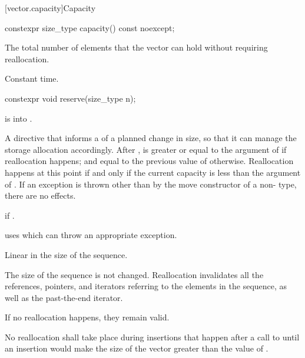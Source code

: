 [vector.capacity]{Capacity}

%
\begin{itemdecl}
constexpr size_type capacity() const noexcept;
\end{itemdecl}

\begin{itemdescr}
\pnum
\returns
The total number of elements that the vector can hold
without requiring reallocation.

\pnum
\complexity
Constant time.
\end{itemdescr}

%
\begin{itemdecl}
constexpr void reserve(size_type n);
\end{itemdecl}

\begin{itemdescr}
\pnum
\expects
{} is  into .

\pnum
\effects
A directive that informs a
of a planned change in size, so that it can manage the storage allocation accordingly.
After
,
is greater or equal to the argument of
if reallocation happens; and equal to the previous value of
otherwise.
Reallocation happens at this point if and only if the current capacity is less than the
argument of
. If an exception is thrown
other than by the move constructor of a non- type,
there are no effects.

\pnum
\throws
{} if .
\begin{footnote}
 uses  which
can throw an appropriate exception.
\end{footnote}

\pnum
\complexity
Linear in the size of the sequence.

\pnum
\remarks
The size of the sequence is not changed.
Reallocation invalidates all the references, pointers, and iterators
referring to the elements in the sequence, as well as the past-the-end iterator.
\begin{note}
If no reallocation happens, they remain valid.
\end{note}
No reallocation shall take place during insertions that happen
after a call to 
until an insertion would make the size of the vector
greater than the value of .
\end{itemdescr}


